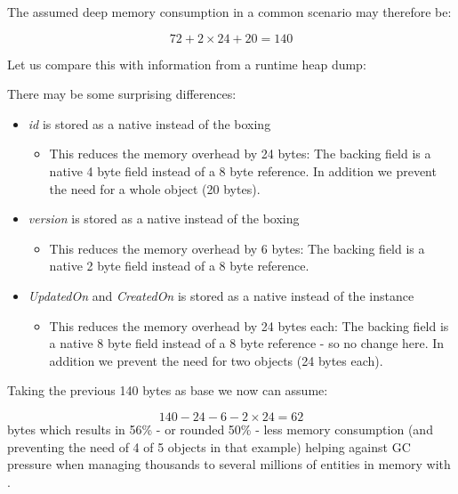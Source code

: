 The assumed deep memory consumption in a common scenario may therefore be:

\[72+2\times24+20=140\]

Let us compare this with information from a runtime heap dump:

\def\showimgref{img/visualvm-queryentity}

There may be some surprising differences:
\begin{itemize}
	\item \emph{id} is stored as a native  instead of the boxing 
		\begin{itemize}
			\item This reduces the memory overhead by 24 bytes: The backing field is a native 4 byte field instead of a 8 byte reference. In addition we prevent the need for a whole  object (20 bytes).
		\end{itemize}
	\item \emph{version} is stored as a native  instead of the boxing 
		\begin{itemize}
			\item This reduces the memory overhead by 6 bytes: The backing field is a native 2 byte field instead of a 8 byte reference.
		\end{itemize}
	\item \emph{UpdatedOn} and \emph{CreatedOn} is stored as a native  instead of the  instance
		\begin{itemize}
			\item This reduces the memory overhead by 24 bytes each: The backing field is a native 8 byte field instead of a 8 byte reference - so no change here. In addition we prevent the need for two  objects (24 bytes each).
		\end{itemize}
\end{itemize}

Taking the previous 140 bytes as base we now can assume:

\[140-24-6-2\times24=62\] bytes which results in 56\% - or rounded 50\% - less memory consumption (and preventing the need of 4 of 5 objects in that example) helping against GC pressure when managing thousands to several millions of entities in memory with \AMBETH.